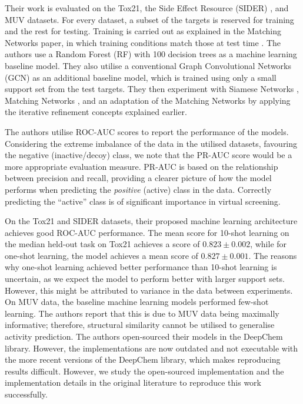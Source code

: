 Their work is evaluated on the Tox21, the Side Effect Resource (SIDER) \citep{kuhn2016sider}, and MUV datasets\citep{rohrer2009maximum}. For every dataset, a subset of the targets is reserved for training and the rest for testing. Training is carried out as explained in the Matching Networks paper, in which training conditions match those at test time \citep{vinyals2016matching}. The authors use a Random Forest (RF) with 100 decision trees as a machine learning baseline model. They also utilise a conventional Graph Convolutional Networks (GCN) \citep{kipf2016semi} as an additional baseline model, which is trained using only a small support set from the test targets. They then experiment with Siamese Networks \citep{koch2015siamese}, Matching Networks \citep{vinyals2016matching}, and an adaptation of the Matching Networks by applying the iterative refinement concepts explained earlier.

The authors utilise ROC-AUC scores to report the performance of the models. Considering the extreme imbalance of the data in the utilised datasets, favouring the negative (inactive/decoy) class, we note that the PR-AUC score would be a more appropriate evaluation measure. PR-AUC is based on the relationship between precision and recall, providing a clearer picture of how the model performs when predicting the \textit{positive} (active) class in the data. Correctly predicting the ``active'' class is of significant importance in virtual screening.

On the Tox21 and SIDER datasets, their proposed machine learning architecture achieves good ROC-AUC performance. The mean score for 10-shot learning on the median held-out task on Tox21 achieves a score of $0.823 \pm 0.002$, while for one-shot learning, the model achieves a mean score of $0.827 \pm 0.001$. The reasons why one-shot learning achieved better performance than 10-shot learning is uncertain, as we expect the model to perform better with larger support sets. However, this might be attributed to variance in the data between experiments. On MUV data, the baseline machine learning models performed few-shot learning. The authors report that this is due to MUV data being maximally informative; therefore, structural similarity cannot be utilised to generalise activity prediction. The authors open-sourced their models in the DeepChem library\citep{ramsundar2019deep}. However, the implementations are now outdated and not executable with the more recent versions of the DeepChem library, which makes reproducing results difficult. However, we study the open-sourced implementation and the implementation details in the original literature to reproduce this work successfully.

